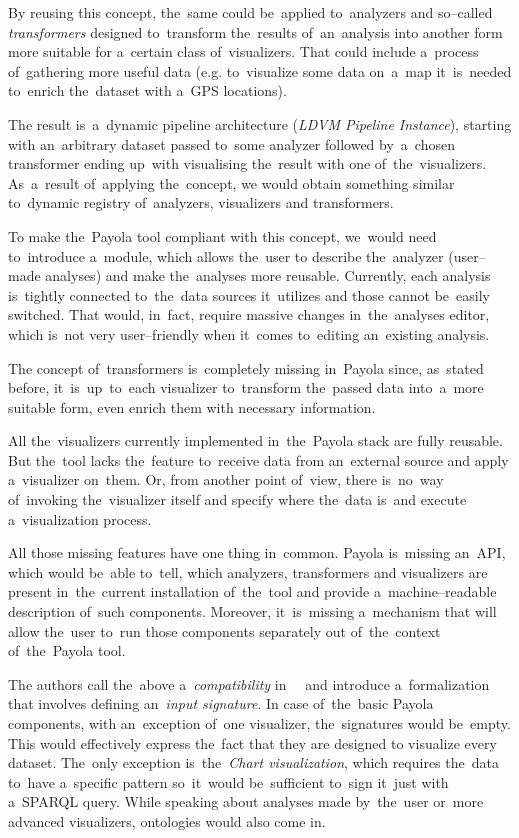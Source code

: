 By reusing this concept, the~same could be~applied to~analyzers and so--called 
\emph{transformers} designed to~transform the~results of~an~analysis 
into another form more suitable for a~certain class of~visualizers. 
That could include a~process of~gathering more useful data (e.g. to~visualize 
some data on~a~map it~is~needed to~enrich the~dataset with a~GPS locations).

The result is~a~dynamic pipeline architecture (\emph{LDVM Pipeline Instance}),
starting with an~arbitrary 
dataset passed to~some analyzer followed by~a~chosen transformer ending up~with
visualising the~result with one of~the~visualizers. As~a~result of~applying the~concept,
we would obtain something similar to~dynamic 
registry of~analyzers, visualizers and transformers.

To make the~Payola tool 
compliant with this concept, we~would need to~introduce a~module, which allows the~user
to describe the~analyzer (user--made analyses) and make the~analyses more reusable. Currently, each analysis is~tightly connected to~the~data sources it~utilizes and those cannot be~easily switched. That would, in~fact, require massive changes in~the~analyses editor, which is~not very 
user--friendly when it~comes to~editing an~existing analysis.

The concept of~transformers is~completely missing in~Payola since, as~stated 
before, it~is~up~to~each visualizer to~transform the~passed data into~a~more 
suitable form, even enrich them with necessary information.

All the~visualizers currently implemented in~the~Payola stack are fully 
reusable. But the~tool lacks the~feature to~receive data from an~external source 
and apply a~visualizer on~them. Or, from another point of~view, there is~no~way of~invoking the~visualizer itself and specify where the~data is~and execute a~visualization process.

All those missing features have one thing in~common. Payola is~missing 
an~API, which would be~able to~tell, which analyzers, transformers and 
visualizers are present in~the~current installation of~the~tool and provide a~machine--readable description of~such components. Moreover, it~is~missing a~mechanism that will allow the~user to~run those components separately out of~the~context of~the~Payola tool.

The authors call the~above a~\emph{compatibility} in~~\cite{ldvm2} and 
introduce a~formalization that involves defining an~\emph{input signature}.
In case of~the~basic Payola components, with an~exception of~one visualizer, the~signatures
would be~empty. This would effectively express the~fact that they are designed to
visualize every dataset. The~only exception is~the~\emph{Chart visualization},
which requires the~data to~have a~specific pattern so~it~would be~sufficient to~sign it~just with a~SPARQL query. While speaking about analyses made by~the~user or~more 
advanced visualizers, ontologies would also come in.

